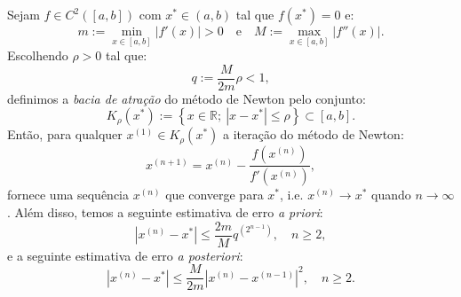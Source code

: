 \begin{teo}
  Sejam $f\in C^2([a, b])$ com $x^*\in (a, b)$ tal que $f(x^*) = 0$ e:
  \begin{equation*}
    m := \min_{x\in [a, b]}|f'(x)| > 0\quad\text{e}\quad M := \max_{x\in [a, b]} |f''(x)|.
  \end{equation*}
Escolhendo $\rho > 0$ tal que:
\begin{equation*}
  q := \frac{M}{2m}\rho < 1, 
\end{equation*}
definimos a \emph{bacia de atração} do método de Newton pelo conjunto:
\begin{equation*}
  K_\rho(x^*) := \left\{x\in\mathbb{R};~|x-x^*| \leq \rho\right\}\subset [a, b].
\end{equation*}
Então, para qualquer $x^{(1)}\in K_\rho(x^*)$ a iteração do método de Newton:
\begin{equation*}
  x^{(n+1)} = x^{(n)} - \frac{f(x^{(n)})}{f'(x^{(n)})},
\end{equation*}
fornece uma sequência $x^{(n)}$ que converge para $x^*$, i.e. $x^{(n)}\to x^*$ quando $n\to \infty$. Além disso, temos a seguinte estimativa de erro \emph{a priori}:
\begin{equation*}
  |x^{(n)} - x^*| \leq \frac{2m}{M}q^{(2^{n-1})},\quad n\geq 2,
\end{equation*}
e a seguinte estimativa de erro \emph{a posteriori}:
\begin{equation*}
  |x^{(n)} - x^*| \leq \frac{M}{2m}|x^{(n)} - x^{(n-1)}|^2,\quad n\geq 2.
\end{equation*}
\end{teo}
